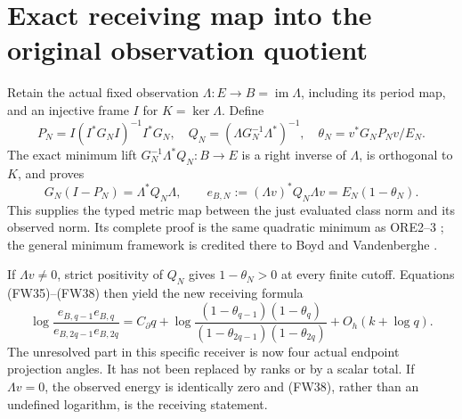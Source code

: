 \documentclass[11pt]{article}
\begin{document}
\section{Exact receiving map into the original observation quotient}
Retain the actual fixed observation $\Lambda:E\to B=\operatorname{im}\Lambda$,
including its period map, and an injective frame $I$ for $K=\ker\Lambda$.
Define
\begin{equation}\tag{FW37}
 P_N=I(I^*G_NI)^{-1}I^*G_N,\quad
 Q_N=(\Lambda G_N^{-1}\Lambda^*)^{-1},\quad
 \theta_N=v^*G_NP_Nv/E_N.
\end{equation}
The exact minimum lift $G_N^{-1}\Lambda^*Q_N:B\to E$ is a right
inverse of $\Lambda$, is orthogonal to $K$, and proves
\begin{equation}\tag{FW38}
 G_N(I-P_N)=\Lambda^*Q_N\Lambda,\qquad
 e_{B,N}:=(\Lambda v)^*Q_N\Lambda v=E_N(1-\theta_N).
\end{equation}
This supplies the typed metric map between the just evaluated class norm
and its observed norm. Its complete proof is the same quadratic minimum
as ORE2--3 \cite{ore}; the general minimum framework is credited there
to Boyd and Vandenberghe \cite[Appendix C.4.1]{Boyd}.

If $\Lambda v\ne0$, strict positivity of $Q_N$ gives $1-\theta_N>0$
at every finite cutoff. Equations (FW35)--(FW38) then yield the new
receiving formula
\begin{equation}\tag{FW39}
 \boxed{\log\frac{e_{B,q-1}e_{B,q}}{e_{B,2q-1}e_{B,2q}}
 =C_\partial q+
 \log\frac{(1-\theta_{q-1})(1-\theta_q)}
               {(1-\theta_{2q-1})(1-\theta_{2q})}
 +O_h(k+\log q).}
\end{equation}
The unresolved part in this specific receiver is now four actual endpoint
projection angles. It has not been replaced by ranks or by a scalar total.
If $\Lambda v=0$, the observed energy is identically zero and (FW38),
rather than an undefined logarithm, is the receiving statement.
\end{document}
